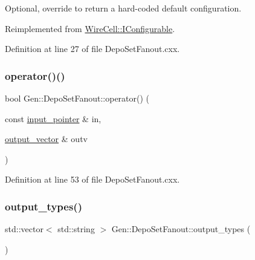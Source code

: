 Optional, override to return a hard-\/coded default configuration. 



Reimplemented from \hyperlink{class_wire_cell_1_1_i_configurable_a54841b2da3d1ea02189478bff96f7998}{Wire\+Cell\+::\+I\+Configurable}.



Definition at line 27 of file Depo\+Set\+Fanout.\+cxx.

\mbox{\label{class_wire_cell_1_1_gen_1_1_depo_set_fanout_ac00025705044f9d201dadd5d0af70fe9}} 
\subsubsection{\texorpdfstring{operator()()}{operator()()}}
{\footnotesize\ttfamily bool Gen\+::\+Depo\+Set\+Fanout\+::operator() (\begin{DoxyParamCaption}\item[{const \hyperlink{class_wire_cell_1_1_i_fanout_node_aefd36d56a531edf1990fe6e263d9c266}{input\+\_\+pointer} \&}]{in,  }\item[{\hyperlink{class_wire_cell_1_1_i_fanout_node_a650cda83709781daac2d67af7c3706df}{output\+\_\+vector} \&}]{outv }\end{DoxyParamCaption})\hspace{0.3cm}{\ttfamily [virtual]}}



Definition at line 53 of file Depo\+Set\+Fanout.\+cxx.

\mbox{\label{class_wire_cell_1_1_gen_1_1_depo_set_fanout_a11637470dcf8dc0ea0cbf6691a6984c0}} 
\subsubsection{\texorpdfstring{output\+\_\+types()}{output\_types()}}
{\footnotesize\ttfamily std\+::vector$<$ std\+::string $>$ Gen\+::\+Depo\+Set\+Fanout\+::output\+\_\+types (\begin{DoxyParamCaption}{ }\end{DoxyParamCaption})\hspace{0.3cm}{\ttfamily [virtual]}}



